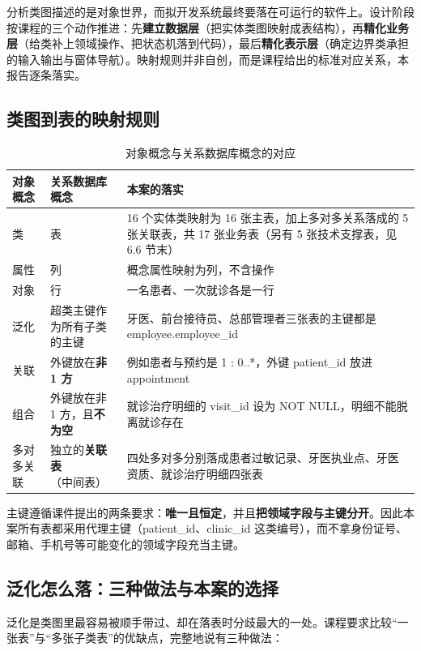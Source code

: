 \documentclass[11pt,a4paper]{ctexart}
\begin{document}
分析类图描述的是对象世界，而拟开发系统最终要落在可运行的软件上。设计阶段按课程的三个动作推进：先\textbf{建立数据层}（把实体类图映射成表结构），再\textbf{精化业务层}（给类补上领域操作、把状态机落到代码），最后\textbf{精化表示层}（确定边界类承担的输入输出与窗体导航）。映射规则并非自创，而是课程给出的标准对应关系，本报告逐条落实。

\subsection{类图到表的映射规则}

\begin{table}[H]
\centering
\caption{对象概念与关系数据库概念的对应}
\begin{tabularx}{\linewidth}{@{}L{3.3cm}L{5.2cm}X@{}}
\toprule
\textbf{\textcolor{adcblue!92}{对象概念}} & \textbf{\textcolor{adcblue!92}{关系数据库概念}} & \textbf{\textcolor{adcblue!92}{本案的落实}} \\
\midrule
类 & 表 & 16 个实体类映射为 16 张主表，加上多对多关系落成的 5 张关联表，共 17 张业务表（另有 5 张技术支撑表，见 6.6 节末） \\
属性 & 列 & 概念属性映射为列，不含操作 \\
对象 & 行 & 一名患者、一次就诊各是一行 \\
泛化 & 超类主键作为所有子类的主键 & 牙医、前台接待员、总部管理者三张表的主键都是 employee.employee\_id \\
关联 & 外键放在\textbf{非 1 方} & 例如患者与预约是 1 : 0..*，外键 patient\_id 放进 appointment \\
组合 & 外键放在非 1 方，且\textbf{不为空} & 就诊治疗明细的 visit\_id 设为 NOT NULL，明细不能脱离就诊存在 \\
多对多关联 & 独立的\textbf{关联表}（中间表） & 四处多对多分别落成患者过敏记录、牙医执业点、牙医资质、就诊治疗明细四张表 \\
\bottomrule
\end{tabularx}
\end{table}

主键遵循课件提出的两条要求：\textbf{唯一且恒定}，并且\textbf{把领域字段与主键分开}。因此本案所有表都采用代理主键（patient\_id、clinic\_id 这类编号），而不拿身份证号、邮箱、手机号等可能变化的领域字段充当主键。

\subsection{泛化怎么落：三种做法与本案的选择}

泛化是类图里最容易被顺手带过、却在落表时分歧最大的一处。课程要求比较“一张表”与“多张子类表”的优缺点，完整地说有三种做法：
\end{document}
